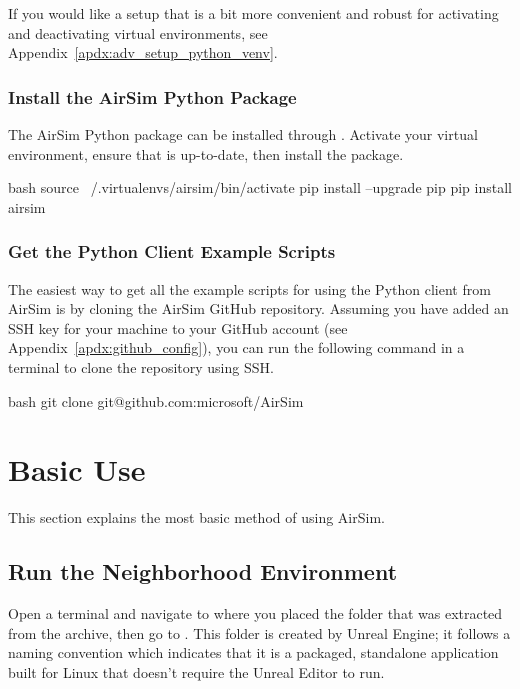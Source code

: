 If you would like a setup that is a bit more convenient and robust for activating and deactivating virtual environments, see Appendix~\ref{apdx:adv_setup_python_venv}.

\subsubsection{Install the AirSim Python Package}
The AirSim Python package can be installed through . Activate your virtual environment, ensure that  is up-to-date, then install the  package.
\begin{minttcb}{bash}
    source ~/.virtualenvs/airsim/bin/activate
    pip install --upgrade pip
    pip install airsim
\end{minttcb}

\subsubsection{Get the Python Client Example Scripts}
The easiest way to get all the example scripts for using the Python client from AirSim is by cloning the AirSim GitHub repository. Assuming you have added an SSH key for your machine to your GitHub account (see Appendix~\ref{apdx:github_config}), you can run the following command in a terminal to clone the repository using SSH.
\begin{minttcb}{bash}
    git clone git@github.com:microsoft/AirSim
\end{minttcb}

\section{Basic Use}\label{sec:basic_use_airsim}

This section explains the most basic method of using AirSim.

\subsection{Run the Neighborhood Environment}
Open a terminal and navigate to where you placed the  folder that was extracted from the  archive, then go to . This  folder is created by Unreal Engine; it follows a naming convention which indicates that it is a packaged, standalone application built for Linux that doesn't require the Unreal Editor to run.

